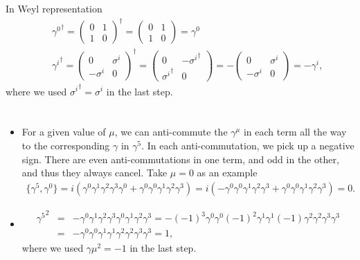 \documentclass[11pt]{article}
\begin{document}
\section{ }
In Weyl representation
\begin{eqnarray}
    &&{\gamma^0}^\dagger =
    \begin{pmatrix}
        0 & 1\\
        1 & 0
    \end{pmatrix}^\dagger
    =
    \begin{pmatrix}
        0 & 1\\
        1 & 0
    \end{pmatrix}
    =\gamma^0 \\
    && {\gamma^i}^\dagger =
    \begin{pmatrix}
        0 &\sigma^i\\
        -\sigma^i & 0
    \end{pmatrix}^\dagger
    =
    \begin{pmatrix}
        0 &-{\sigma^i}^\dagger\\
        {\sigma^i}^\dagger & 0
    \end{pmatrix}
    =-
    \begin{pmatrix}
        0 &\sigma^i\\
        -\sigma^i & 0
    \end{pmatrix}
    =-\gamma^i,
\end{eqnarray}
where we used ${\sigma^i}^\dagger =\sigma^i$ in the last step.

\section{ }
\begin{itemize}
    \item For a given value of $\mu$, we can anti-commute the $\gamma^\mu$ in each term all the way to the corresponding $\gamma$ in $\gamma^5$. In each anti-commutation, we pick up a negative sign. There are even anti-commutations in one term, and odd in the other, and thus they always cancel. Take $\mu = 0$ as an example
    \begin{eqnarray}
        \{\gamma^5,\gamma^0\}=i(\gamma^0 \gamma^1 \gamma^2 \gamma^3 \gamma^0+\gamma^0 \gamma^0 \gamma^1 \gamma^2 \gamma^3)=i(-\gamma^0 \gamma^0 \gamma^1 \gamma^2 \gamma^3+\gamma^0 \gamma^0 \gamma^1 \gamma^2 \gamma^3)=0.
    \end{eqnarray}
    \item 
    \begin{eqnarray}
        {\gamma^5}^2&=&-\gamma^0 \gamma^1 \gamma^2 \gamma^3 \gamma^0 \gamma^1 \gamma^2 \gamma^3 =-(-1)^3\gamma^0 \gamma^0 (-1)^2 \gamma^1 \gamma^1 (-1)\gamma^2 \gamma^2 \gamma^3 \gamma^3 \\ 
        &=& -\gamma^0 \gamma^0  \gamma^1 \gamma^1 \gamma^2 \gamma^2 \gamma^3 \gamma^3 =1,
    \end{eqnarray}
    where we used ${\gamma\mu}^2=-1$ in the last step.
\end{itemize}
\end{document}
